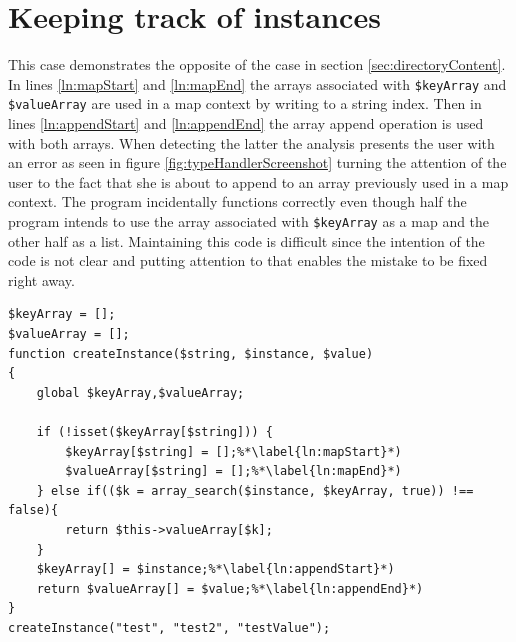 \section{Keeping track of instances}
This case demonstrates the opposite of the case in section \ref{sec:directoryContent}. In lines \ref{ln:mapStart} and \ref{ln:mapEnd} the arrays associated with \texttt{\$keyArray} and \texttt{\$valueArray} are used in a map context by writing to a string index. Then in lines \ref{ln:appendStart} and \ref{ln:appendEnd} the array append operation is used with both arrays. When detecting the latter the analysis presents the user with an error as seen in figure \ref{fig:typeHandlerScreenshot} turning the attention of the user to the fact that she is about to append to an array previously used in a map context. The program incidentally functions correctly even though half the program intends to use the array associated with \texttt{\$keyArray} as a map and the other half as a list. Maintaining this code is difficult since the intention of the code is not clear and putting attention to that enables the mistake to be fixed right away.

\begin{program}
\begin{lstlisting}
$keyArray = [];
$valueArray = [];
function createInstance($string, $instance, $value)
{
    global $keyArray,$valueArray;

    if (!isset($keyArray[$string])) { 
        $keyArray[$string] = [];%*\label{ln:mapStart}*)
        $valueArray[$string] = [];%*\label{ln:mapEnd}*)
    } else if(($k = array_search($instance, $keyArray, true)) !== false){
        return $this->valueArray[$k];
    }
    $keyArray[] = $instance;%*\label{ln:appendStart}*)
    return $valueArray[] = $value;%*\label{ln:appendEnd}*)
}
createInstance("test", "test2", "testValue");
\end{lstlisting}
\caption{}
\label{lst:typeHandler}
\end{program}

